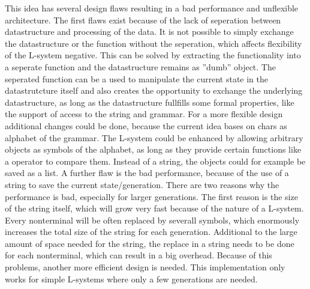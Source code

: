 \documentclass[english]{cpp-hmwk}
\begin{document}
\medskip
\noindent This idea has several design flaws resulting in a bad performance and unflexible architecture. The first flaws exist because of the lack of seperation between datastructure and processing of the data. It is not possible to simply exchange the datastructure or the function without the seperation, which affects flexibility of the L-system negative. This can be solved by extracting the functionality into a seperate function and the datastructure remains as ''dumb'' object. The seperated function can be a used to manipulate the current state in the datastrutcture itself and also creates the opportunity to exchange the underlying datastructure, as long as the datastructure fullfills some formal properties, like the support of access to the string and grammar.\newline
For a more flexible design additional changes could be done, because the current idea bases on chars as alphabet of the grammar. The L-system could be enhanced by allowing arbitrary objects as symbols of the alphabet, as long as they provide certain functions like a operator to compare them. Instead of a string, the objects could for example be saved as a list.\newline
A further flaw is the bad performance, because of the use of a string to save the current state/generation. There are two reasons why the performance is bad, especially for larger generations. The first reason is the size of the string itself, which will grow very fast because of the nature of a L-system. Every nonterminal will be often replaced by severall symbols, which enormously increases the total size of the string for each generation. Additional to the large amount of space needed for the string, the replace in a string needs to be done for each nonterminal, which can result in a big overhead. Because of this problems, another more efficient design is needed.\newline
This implementation only works for simple L-systems where only a few generations are needed.
\end{document}
